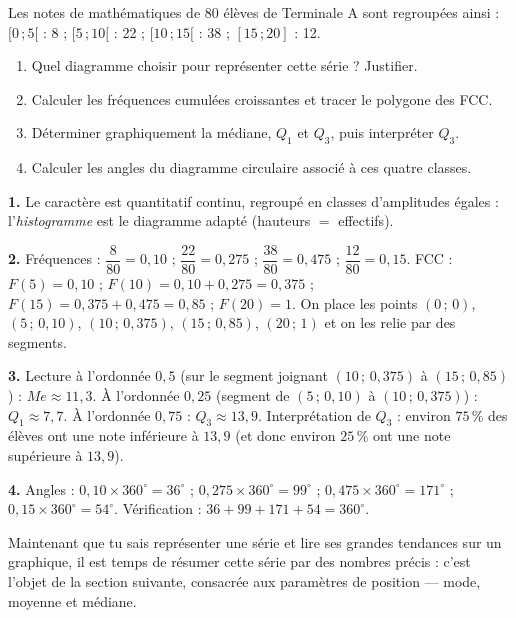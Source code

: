 \documentclass[11pt]{article}
\begin{document}
\begin{exercice}
Les notes de mathématiques de 80 élèves de Terminale A sont regroupées ainsi : $[0\,;5[$ : 8 ; $[5\,;10[$ : 22 ; $[10\,;15[$ : 38 ; $[15\,;20]$ : 12.
\begin{enumerate}
\item Quel diagramme choisir pour représenter cette série ? Justifier.
\item Calculer les fréquences cumulées croissantes et tracer le polygone des FCC.
\item Déterminer graphiquement la médiane, $Q_1$ et $Q_3$, puis interpréter $Q_3$.
\item Calculer les angles du diagramme circulaire associé à ces quatre classes.
\end{enumerate}
\end{exercice}

\begin{corrige}[Exercice]
\textbf{1.} Le caractère est quantitatif continu, regroupé en classes d'amplitudes égales : l'\emph{histogramme} est le diagramme adapté (hauteurs $=$ effectifs).

\textbf{2.} Fréquences : $\dfrac{8}{80} = 0{,}10$ ; $\dfrac{22}{80} = 0{,}275$ ; $\dfrac{38}{80} = 0{,}475$ ; $\dfrac{12}{80} = 0{,}15$. FCC : $F(5) = 0{,}10$ ; $F(10) = 0{,}10 + 0{,}275 = 0{,}375$ ; $F(15) = 0{,}375 + 0{,}475 = 0{,}85$ ; $F(20) = 1$. On place les points $(0\,;\,0)$, $(5\,;\,0{,}10)$, $(10\,;\,0{,}375)$, $(15\,;\,0{,}85)$, $(20\,;\,1)$ et on les relie par des segments.

\textbf{3.} Lecture à l'ordonnée $0{,}5$ (sur le segment joignant $(10\,;\,0{,}375)$ à $(15\,;\,0{,}85)$) : $Me \approx 11{,}3$. À l'ordonnée $0{,}25$ (segment de $(5\,;\,0{,}10)$ à $(10\,;\,0{,}375)$) : $Q_1 \approx 7{,}7$. À l'ordonnée $0{,}75$ : $Q_3 \approx 13{,}9$. Interprétation de $Q_3$ : environ $75\,\%$ des élèves ont une note inférieure à $13{,}9$ (et donc environ $25\,\%$ ont une note supérieure à $13{,}9$).

\textbf{4.} Angles : $0{,}10 \times 360^{\circ} = 36^{\circ}$ ; $0{,}275 \times 360^{\circ} = 99^{\circ}$ ; $0{,}475 \times 360^{\circ} = 171^{\circ}$ ; $0{,}15 \times 360^{\circ} = 54^{\circ}$. Vérification : $36 + 99 + 171 + 54 = 360^{\circ}$.
\end{corrige}

Maintenant que tu sais représenter une série et lire ses grandes tendances sur un graphique, il est temps de résumer cette série par des nombres précis : c'est l'objet de la section suivante, consacrée aux paramètres de position — mode, moyenne et médiane.
\end{document}

